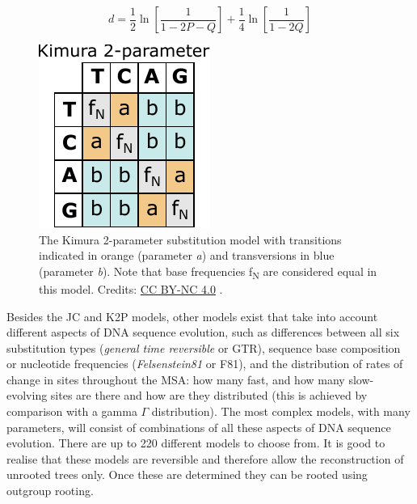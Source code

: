 \begin{equation}
d = \frac{1}{2} \ln{\left[ \frac{1}{1 - 2P - Q} \right]} + \frac{1}{4} \ln{\left[ \frac{1}{1 - 2Q} \right]}
\end{equation}

\begin{figure}[!htbp]
\centering
\includegraphics[width=0.375\linewidth]{files/K2P-c696dd10a2e3e6b29cdcb3abb91f60d1.pdf}
\caption[]{The Kimura 2-parameter substitution \newline
model with transitions indicated in \newline
orange (parameter \textit{a}) and transversions \newline
in blue (parameter \textit{b}). \newline
Note that base frequencies f\textsubscript{N} \newline
are considered equal in this model. \newline
Credits: \href{https://creativecommons.org/licenses/by-nc/4.0/}{CC BY-NC 4.0} \cite{own_3_2024}.}
\label{K2P}
\end{figure}

Besides the JC and K2P models, other models exist that take into account different aspects of DNA sequence evolution, such as differences between all six substitution types (\textit{general time reversible} or GTR), sequence base composition or nucleotide frequencies (\textit{Felsenstein81} or F81), and the distribution of rates of change in sites throughout the MSA: how many fast, and how many slow-evolving sites are there and how are they distributed (this is achieved by comparison with a gamma $\Gamma$ distribution).
The most complex models, with many parameters, will consist of combinations of all these aspects of DNA sequence evolution.
There are up to 220 different models to choose from.
It is good to realise that these models are reversible and therefore allow the reconstruction of unrooted trees only.
Once these are determined they can be rooted using outgroup rooting.

